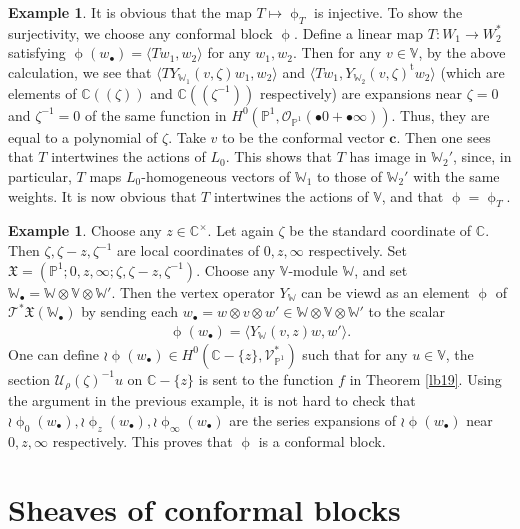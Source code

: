 \documentclass[12pt,a4paper,notitlepage]{report}
\theoremstyle{definition}
\newtheorem{eg}[df]{Example}
\theoremstyle{plain}
\newcommand{\fk}{\mathfrak}
\newcommand{\mc}{\mathcal}
\newcommand{\tr}{\mathrm{t}} %
\newcommand{\bk}[1]{\langle {#1}\rangle}
\newcommand{\scr}{\mathscr}
\newcommand{\blt}{\bullet}
\newcommand{\Vbb}{\mathbb V}
\newcommand{\Wbb}{\mathbb W}
\newcommand{\Cbb}{\mathbb C}
\newcommand{\Pbb}{\mathbb P}
\newcommand{\cbf}{\mathbf c}
\numberwithin{equation}{section}
\begin{document}
\begin{eg}
It is obvious that the map $T\mapsto\upphi_T$ is injective. To show the surjectivity, we choose any conformal block $\upphi$. Define a linear map $T:W_1\rightarrow W_2^*$ satisfying  $\upphi(w_\blt)=\bk{Tw_1,w_2}$ for any $w_1,w_2$. Then for any $v\in \Vbb$, by the above calculation, we see that   $\bk{TY_{\Wbb_1}(v,\zeta)w_1,w_2}$ and $\bk{Tw_1,Y_{\Wbb_2}(v,\zeta)^\tr w_2}$ (which are elements of $\Cbb((\zeta))$ and $\Cbb((\zeta^{-1}))$ respectively) are expansions near $\zeta=0$ and $\zeta^{-1}=0$ of the same function in $H^0(\Pbb^1,\scr O_{\Pbb^1}(\blt 0+\blt\infty))$. Thus, they are equal to a polynomial of $\zeta$. Take $v$ to be the conformal vector $\cbf$. Then one sees that $T$ intertwines the actions of $L_0$. This shows that $T$ has image in $\Wbb_2'$, since, in particular, $T$ maps $L_0$-homogeneous vectors of $\Wbb_1$ to those of $\Wbb_2'$ with the same weights. It is now obvious that $T$ intertwines the actions of $\Vbb$, and that $\upphi=\upphi_T$.
\end{eg}


\begin{eg}\label{lb44}
Choose any $z\in\Cbb^\times$.  Let again $\zeta$ be the standard coordinate of $\Cbb$. Then $\zeta,\zeta-z,\zeta^{-1}$ are local coordinates of $0,z,\infty$ respectively. Set  $\fk X=(\Pbb^1;0,z,\infty;\zeta,\zeta-z,\zeta^{-1})$. Choose any $\Vbb$-module $\Wbb$, and set  $\Wbb_\blt=\Wbb\otimes\Vbb\otimes\Wbb'$. Then the vertex operator $Y_\Wbb$ can be viewd as an element $\upphi$ of $\scr T^*{\fk X}(\Wbb_\blt)$ by sending each $w_\blt=w\otimes v\otimes w'\in\Wbb\otimes\Vbb\otimes\Wbb'$ to the scalar
\begin{align*}
\upphi(w_\blt)=\bk{Y_\Wbb(v,z)w,w'}.
\end{align*}
One can define $\wr\upphi(w_\blt)\in H^0(\Cbb-\{z\},\scr V_{\Pbb^1}^*)$ such that for any $u\in\Vbb$, the section $\mc U_\rho(\zeta)^{-1}u$ on $\Cbb-\{z\}$ is sent to the function $f$ in Theorem \ref{lb19}. Using the argument in the previous example, it is not hard to check that $\wr\upphi_0(w_\blt),\wr\upphi_z(w_\blt),\wr\upphi_\infty(w_\blt)$ are the series expansions of $\wr\upphi(w_\blt)$ near $0,z,\infty$ respectively. This proves that $\upphi$ is a conformal block.
\end{eg}






\section{Sheaves of conformal blocks}
\end{document}
